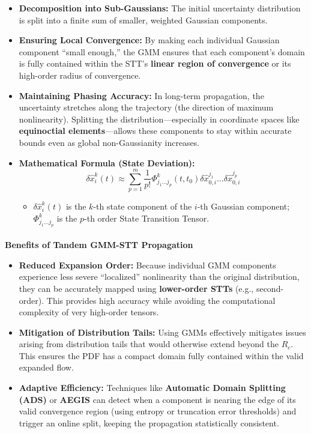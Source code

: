 \documentclass[
  letterpaper,
  DIV=11,
  numbers=noendperiod,
  oneside]{scrartcl}
\makeatletter
\let\oldparagraph\paragraph
\renewcommand{\paragraph}{
    \@ifstar
      \xxxParagraphStar
      \xxxParagraphNoStar
  }
\newcommand{\xxxParagraphStar}[1]{\oldparagraph*{#1}\mbox{}}
\newcommand{\xxxParagraphNoStar}[1]{\oldparagraph{#1}\mbox{}}
\providecommand{\tightlist}{%
  \setlength{\itemsep}{0pt}\setlength{\parskip}{0pt}}
\makeatother
\begin{document}
\begin{itemize}
\item
  \textbf{Decomposition into Sub-Gaussians:} The initial uncertainty
  distribution is split into a finite sum of smaller, weighted Gaussian
  components.
\item
  \textbf{Ensuring Local Convergence:} By making each individual
  Gaussian component ``small enough,'' the GMM ensures that each
  component's domain is fully contained within the STT's \textbf{linear
  region of convergence} or its high-order radius of convergence.
\item
  \textbf{Maintaining Phasing Accuracy:} In long-term propagation, the
  uncertainty stretches along the trajectory (the direction of maximum
  nonlinearity). Splitting the distribution---especially in coordinate
  spaces like \textbf{equinoctial elements}---allows these components to
  stay within accurate bounds even as global non-Gaussianity increases.
\item
  \textbf{Mathematical Formula (State Deviation):} \[
  \delta \hat{x}_{i}^k(t) \approx \sum_{p=1}^{m} \frac{1}{p!} \Phi^k_{j_1...j_p}(t, t_0) \delta \hat{x}_{0,i}^{j_1} \dots \delta \hat{x}_{0,i}^{j_p}
  \]

  \begin{itemize}
  \tightlist
  \item
    \(\delta \hat{x}_{i}^k(t)\) is the \(k\)-th state component of the
    \(i\)-th Gaussian component; \(\Phi^k_{j_1...j_p}\) is the \(p\)-th
    order State Transition Tensor.
  \end{itemize}
\end{itemize}

\paragraph{\texorpdfstring{\textbf{Benefits of Tandem GMM-STT
Propagation}}{Benefits of Tandem GMM-STT Propagation}}\label{benefits-of-tandem-gmm-stt-propagation}

\begin{itemize}
\item
  \textbf{Reduced Expansion Order:} Because individual GMM components
  experience less severe ``localized'' nonlinearity than the original
  distribution, they can be accurately mapped using \textbf{lower-order
  STTs} (e.g., second-order). This provides high accuracy while avoiding
  the computational complexity of very high-order tensors.
\item
  \textbf{Mitigation of Distribution Tails:} Using GMMs effectively
  mitigates issues arising from distribution tails that would otherwise
  extend beyond the \(R_c\). This ensures the PDF has a compact domain
  fully contained within the valid expanded flow.
\item
  \textbf{Adaptive Efficiency:} Techniques like \textbf{Automatic Domain
  Splitting (ADS)} or \textbf{AEGIS} can detect when a component is
  nearing the edge of its valid convergence region (using entropy or
  truncation error thresholds) and trigger an online split, keeping the
  propagation statistically consistent.
\end{itemize}
\end{document}
